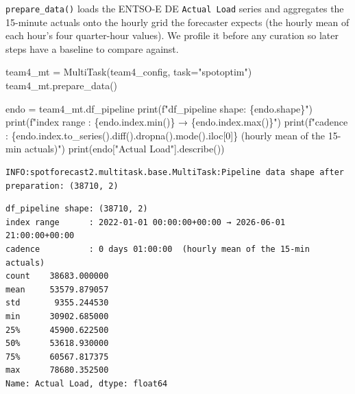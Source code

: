 \documentclass[
  english,
  letterpaper,
]{scrbook}
\newenvironment{Shaded}{\begin{snugshade}}{\end{snugshade}}
\newcommand{\BuiltInTok}[1]{\textcolor[rgb]{0.00,0.23,0.31}{#1}}
\newcommand{\DecValTok}[1]{\textcolor[rgb]{0.68,0.00,0.00}{#1}}
\newcommand{\NormalTok}[1]{\textcolor[rgb]{0.00,0.23,0.31}{#1}}
\newcommand{\OperatorTok}[1]{\textcolor[rgb]{0.37,0.37,0.37}{#1}}
\newcommand{\SpecialCharTok}[1]{\textcolor[rgb]{0.37,0.37,0.37}{#1}}
\newcommand{\SpecialStringTok}[1]{\textcolor[rgb]{0.13,0.47,0.30}{#1}}
\newcommand{\StringTok}[1]{\textcolor[rgb]{0.13,0.47,0.30}{#1}}
\begin{document}
\texttt{prepare\_data()} loads the ENTSO-E DE \texttt{Actual\ Load}
series and aggregates the 15-minute actuals onto the hourly grid the
forecaster expects (the hourly mean of each hour's four quarter-hour
values). We profile it before any curation so later steps have a
baseline to compare against.

\protect{}\label{team4-prepare}
\begin{Shaded}
\begin{Highlighting}[]
\NormalTok{team4\_mt }\OperatorTok{=}\NormalTok{ MultiTask(team4\_config, task}\OperatorTok{=}\StringTok{"spotoptim"}\NormalTok{)}
\NormalTok{team4\_mt.prepare\_data()}

\NormalTok{endo }\OperatorTok{=}\NormalTok{ team4\_mt.df\_pipeline}
\BuiltInTok{print}\NormalTok{(}\SpecialStringTok{f"df\_pipeline shape: }\SpecialCharTok{\{}\NormalTok{endo}\SpecialCharTok{.}\NormalTok{shape}\SpecialCharTok{\}}\SpecialStringTok{"}\NormalTok{)}
\BuiltInTok{print}\NormalTok{(}\SpecialStringTok{f"index range      : }\SpecialCharTok{\{}\NormalTok{endo}\SpecialCharTok{.}\NormalTok{index}\SpecialCharTok{.}\BuiltInTok{min}\NormalTok{()}\SpecialCharTok{\}}\SpecialStringTok{ → }\SpecialCharTok{\{}\NormalTok{endo}\SpecialCharTok{.}\NormalTok{index}\SpecialCharTok{.}\BuiltInTok{max}\NormalTok{()}\SpecialCharTok{\}}\SpecialStringTok{"}\NormalTok{)}
\BuiltInTok{print}\NormalTok{(}\SpecialStringTok{f"cadence          : }\SpecialCharTok{\{}\NormalTok{endo}\SpecialCharTok{.}\NormalTok{index}\SpecialCharTok{.}\NormalTok{to\_series()}\SpecialCharTok{.}\NormalTok{diff()}\SpecialCharTok{.}\NormalTok{dropna()}\SpecialCharTok{.}\NormalTok{mode()}\SpecialCharTok{.}\NormalTok{iloc[}\DecValTok{0}\NormalTok{]}\SpecialCharTok{\}}\SpecialStringTok{  (hourly mean of the 15{-}min actuals)"}\NormalTok{)}
\BuiltInTok{print}\NormalTok{(endo[}\StringTok{"Actual Load"}\NormalTok{].describe())}
\end{Highlighting}
\end{Shaded}

\begin{verbatim}
INFO:spotforecast2.multitask.base.MultiTask:Pipeline data shape after preparation: (38710, 2)
\end{verbatim}

\begin{verbatim}
df_pipeline shape: (38710, 2)
index range      : 2022-01-01 00:00:00+00:00 → 2026-06-01 21:00:00+00:00
cadence          : 0 days 01:00:00  (hourly mean of the 15-min actuals)
count    38683.000000
mean     53579.879057
std       9355.244530
min      30902.685000
25%      45900.622500
50%      53618.930000
75%      60567.817375
max      78680.352500
Name: Actual Load, dtype: float64
\end{verbatim}
\end{document}
